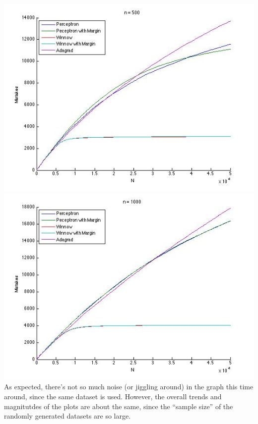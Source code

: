 \begin{enumerate}
 \includegraphics[scale=0.5]{HW3_code/n500_memoize}\\
 \includegraphics[scale=0.5]{HW3_code/n1000_memoize}\\
As expected, there's not so much noise (or jiggling around) in the graph this time around, since the same dataset is used. However, the overall trends and magnitutdes of the plots are about the same, since the ``sample size'' of the randomly generated datasets are so large.








\end{enumerate}
